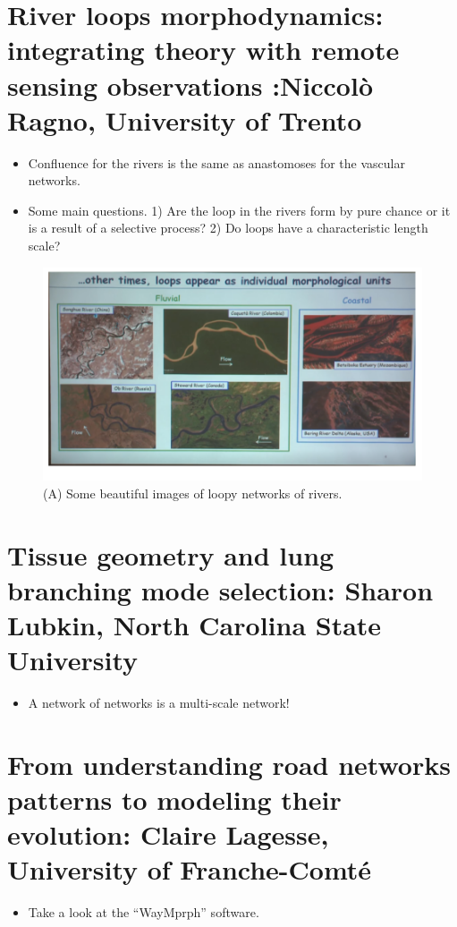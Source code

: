 \documentclass[12pt,a4paper]{article}
\begin{document}
	
	\section{River loops morphodynamics: integrating theory with remote sensing observations :Niccolò Ragno, University of Trento}
	\begin{itemize}
		\item Confluence for the rivers is the same as anastomoses for the vascular networks.
		\item Some main questions. 1) Are the loop in the rivers form by pure chance or it is a result of a selective process? 2) Do loops have a characteristic length scale?
	\end{itemize}
	
	\begin{figure}[h!]
		\centering
		\includegraphics[width=0.7\linewidth]{NiccoloTalk.png}
		\caption{(A) Some beautiful images of loopy networks of rivers. }
	\end{figure}
	
	\FloatBarrier
	
	\section{Tissue geometry and lung branching mode selection: Sharon Lubkin, North Carolina State University}
	\begin{itemize}
		\item A network of networks is a multi-scale network!
	\end{itemize}

	
	\section{From understanding road networks patterns to modeling their evolution: Claire Lagesse, University of Franche-Comté} 
	\begin{itemize}
		\item Take a look at the ``WayMprph'' software.
	\end{itemize}
	
\end{document}
